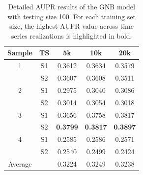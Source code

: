 \begin{table}[!t]
\vspace*{-\baselineskip}
\centering
\caption{Detailed AUPR results of the GNB model with testing size 100. For each training set size, the highest AUPR value across time series realizations is highlighted in bold.}
\label{tab:supp_test100}
{\renewcommand{\arraystretch}{0.9}
\setlength{\tabcolsep}{6pt}
\begin{tabular}{c cccc}
\toprule
Sample & TS & 5k & 10k & 20k \\
\midrule
1 & S1 & 0.3612 & 0.3634 & 0.3579 \\
  & S2 & 0.3607 & 0.3608 & 0.3511 \\

2 & S1 & 0.2975 & 0.3040 & 0.3086 \\
  & S2 & 0.3014 & 0.3054 & 0.3018 \\

3 & S1 & 0.3656 & 0.3758 & 0.3817 \\
  & S2 & \textbf{0.3799} & \textbf{0.3817} & \textbf{0.3897} \\

4 & S1 & 0.2585 & 0.2586 & 0.2571 \\
  & S2 & 0.2540 & 0.2499 & 0.2424 \\
\midrule
Average &  & 0.3224 & 0.3249 & 0.3238 \\
\bottomrule
\end{tabular}
}
\end{table}

